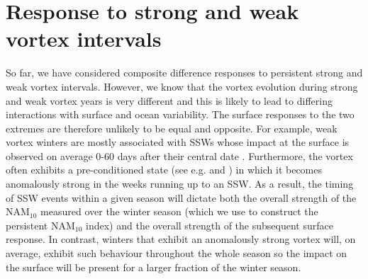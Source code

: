 \section{Response to strong and weak vortex intervals}
So far, we have considered composite difference responses to persistent strong and weak vortex intervals. However, we know that the vortex evolution during strong and weak vortex years is very different and this is likely to lead to differing interactions with surface and ocean variability. The surface responses to the two extremes are therefore unlikely to be equal and opposite. For example, weak vortex winters are mostly associated with SSWs whose impact at the surface is observed on average 0-60 days after their central date \citep{baldwinStratospheric2001a}. Furthermore,  the vortex often exhibits a pre-conditioned state (see e.g. \cite{charltonNew2007c} and \cite{bancalaPreconditioning2012b}) in which it becomes anomalously strong in the weeks running up to an SSW. As a result, the timing of SSW events within a given season will dictate both the overall strength of the NAM$_{10}$ measured over the winter season (which we use to construct the persistent NAM$_{10}$ index) and the overall strength of the subsequent surface response. In contrast, winters that exhibit an anomalously strong vortex will, on average, exhibit such behaviour throughout the whole season so the impact on the surface will be present for a larger fraction of the winter season.

